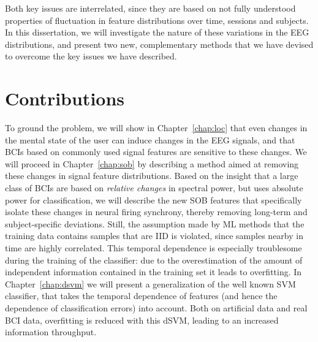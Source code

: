 Both key issues are interrelated, since they are based on not fully
understood properties of fluctuation in feature distributions over time,
sessions and subjects. In this dissertation, we will investigate the nature of
these variations in the \ac{EEG} distributions, and present two new,
complementary methods that we have devised to overcome the key
issues we have described.

\section{Contributions}
To ground the problem, we will show in Chapter~\ref{chap:loc} that even changes
in the mental state of the user can induce changes in the \ac{EEG} signals, and
that \acp{BCI} based on commonly used signal features are sensitive to these
changes. 
%
We will proceed in Chapter~\ref{chap:sob} by describing a method aimed at
removing these changes in signal feature distributions. Based on the insight
that a large class of \acp{BCI} are based on \emph{relative changes} in
spectral power, but uses absolute power for classification, we will describe
the new \ac{SOB} features that specifically isolate these changes in neural
firing synchrony, thereby removing long-term and subject-specific deviations.
%
Still, the assumption made by \ac{ML} methods that the training data contains
samples that are \ac{IID} is violated, since samples nearby in time are highly
correlated. This temporal dependence is especially troublesome during the
training of the classifier: due to the overestimation of the amount of
independent information contained in the training set it leads to overfitting.
%
In Chapter~\ref{chap:dsvm} we will present a generalization of the well known
\ac{SVM} classifier, that takes the temporal dependence of features (and hence
the dependence of classification errors) into account. Both on artificial data
and real \ac{BCI} data, overfitting is reduced with this \ac{dSVM}, leading to
an increased information throughput.


